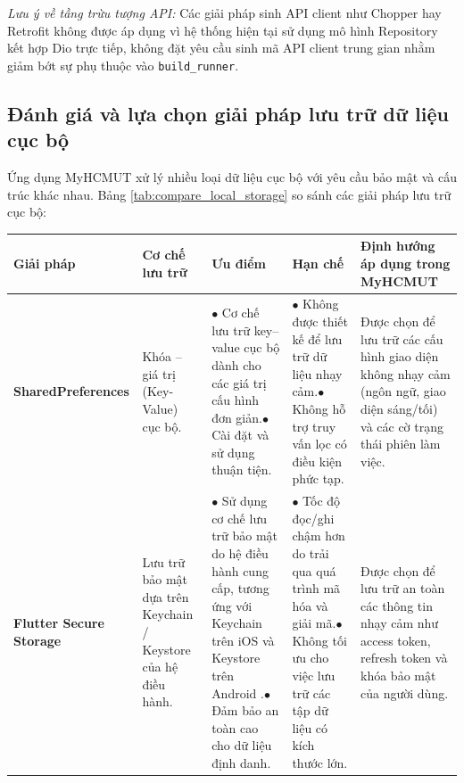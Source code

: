 \noindent \textit{Lưu ý về tầng trừu tượng API:} Các giải pháp sinh API client như Chopper hay Retrofit không được áp dụng vì hệ thống hiện tại sử dụng mô hình Repository kết hợp Dio trực tiếp, không đặt yêu cầu sinh mã API client trung gian nhằm giảm bớt sự phụ thuộc vào \texttt{build\_runner}.

\subsection{Đánh giá và lựa chọn giải pháp lưu trữ dữ liệu cục bộ}
\label{subsec:compare_local_storage}

Ứng dụng MyHCMUT xử lý nhiều loại dữ liệu cục bộ với yêu cầu bảo mật và cấu trúc khác nhau. Bảng \ref{tab:compare_local_storage} so sánh các giải pháp lưu trữ cục bộ:

\begin{table}[H]
    \centering
    \small
    \renewcommand{\arraystretch}{1.25}
    \begin{tabularx}{\textwidth}{|L{2.3cm}|L{2.3cm}|Y|Y|L{2.8cm}|}
    \hline
    \textbf{Giải pháp} & \textbf{Cơ chế lưu trữ} & \textbf{Ưu điểm} & \textbf{Hạn chế} & \textbf{Định hướng áp dụng trong MyHCMUT} \\
    \hline
    \textbf{Shared\allowbreak Preferences} & Khóa -- giá trị (Key-Value) cục bộ. & $\bullet$ Cơ chế lưu trữ key--value cục bộ dành cho các giá trị cấu hình đơn giản.\newline $\bullet$ Cài đặt và sử dụng thuận tiện. & $\bullet$ Không được thiết kế để lưu trữ dữ liệu nhạy cảm.\newline $\bullet$ Không hỗ trợ truy vấn lọc có điều kiện phức tạp. & Được chọn để lưu trữ các cấu hình giao diện không nhạy cảm (ngôn ngữ, giao diện sáng/tối) và các cờ trạng thái phiên làm việc. \\
    \hline
    \textbf{Flutter Secure Storage} & Lưu trữ bảo mật dựa trên Keychain / Keystore của hệ điều hành. & $\bullet$ Sử dụng cơ chế lưu trữ bảo mật do hệ điều hành cung cấp, tương ứng với Keychain trên iOS \cite{ios_keychain_doc} và Keystore trên Android \cite{android_keystore_doc}.\newline $\bullet$ Đảm bảo an toàn cao cho dữ liệu định danh. & $\bullet$ Tốc độ đọc/ghi chậm hơn do trải qua quá trình mã hóa và giải mã.\newline $\bullet$ Không tối ưu cho việc lưu trữ các tập dữ liệu có kích thước lớn. & Được chọn để lưu trữ an toàn các thông tin nhạy cảm như access token, refresh token và khóa bảo mật của người dùng. \\

\end{tabularx}
\end{table}
